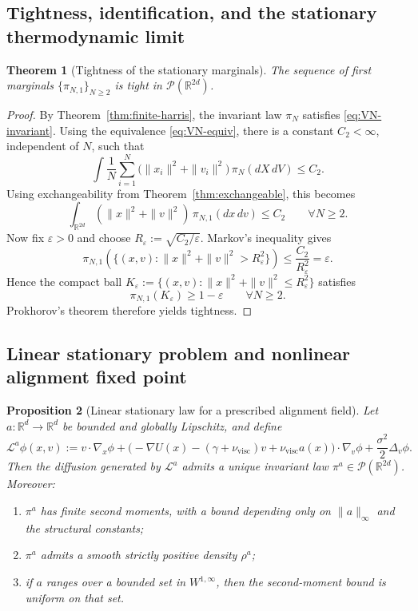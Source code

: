 \documentclass[11pt]{article}
\newtheorem{theorem}{Theorem}[section]
\newtheorem{proposition}[theorem]{Proposition}
\theoremstyle{definition}
\theoremstyle{remark}
\newcommand{\R}{\mathbb{R}}
\newcommand{\mcP}{\mathcal{P}}
\begin{document}
\subsection{Tightness, identification, and the stationary thermodynamic limit}

\begin{theorem}[Tightness of the stationary marginals]\label{thm:tight}
The sequence of first marginals $\{\pi_{N,1}\}_{N\geq2}$ is tight in
$\mcP(\R^{2d})$.
\end{theorem}

\begin{proof}
By Theorem~\ref{thm:finite-harris}, the invariant law \(\pi_N\) satisfies
\eqref{eq:VN-invariant}. Using the equivalence \eqref{eq:VN-equiv}, there is a
constant \(C_2<\infty\), independent of \(N\), such that
\[
\int \frac1N\sum_{i=1}^N \bigl(\|x_i\|^2+\|v_i\|^2\bigr)\,\pi_N(dX\,dV)
\leq C_2.
\]
Using exchangeability from Theorem~\ref{thm:exchangeable}, this becomes
\[
\int_{\R^{2d}} (\|x\|^2+\|v\|^2)\,\pi_{N,1}(dx\,dv)\leq C_2
\qquad
\forall N\geq2.
\]
Now fix $\varepsilon>0$ and choose
$R_\varepsilon:=\sqrt{C_2/\varepsilon}$. Markov's inequality gives
\[
\pi_{N,1}\!\left(\{(x,v):\|x\|^2+\|v\|^2>R_\varepsilon^2\}\right)
\leq
\frac{C_2}{R_\varepsilon^2}
=
\varepsilon.
\]
Hence the compact ball
$K_\varepsilon:=\{(x,v):\|x\|^2+\|v\|^2\leq R_\varepsilon^2\}$ satisfies
\[
\pi_{N,1}(K_\varepsilon)\geq 1-\varepsilon
\qquad
\forall N\geq2.
\]
Prokhorov's theorem therefore yields tightness.
\end{proof}

\subsection{Linear stationary problem and nonlinear alignment fixed point}

\begin{proposition}[Linear stationary law for a prescribed alignment field]\label{prop:linear-mf-stationary}
Let \(a:\R^d\to\R^d\) be bounded and globally Lipschitz, and define
\[
\mathcal L^a\phi(x,v)
:=
v\cdot \nabla_x\phi
+\bigl(-\nabla U(x)-(\gamma+\nu_{\mathrm{visc}})v+\nu_{\mathrm{visc}}a(x)\bigr)
\cdot \nabla_v\phi
+\frac{\sigma^2}{2}\Delta_v\phi.
\]
Then the diffusion generated by \(\mathcal L^a\) admits a unique invariant law
\(\pi^a\in\mcP(\R^{2d})\). Moreover:
\begin{enumerate}[label=\textnormal{(\roman*)},leftmargin=1.5em]
\item \(\pi^a\) has finite second moments, with a bound depending only on
\(\|a\|_\infty\) and the structural constants;
\item \(\pi^a\) admits a smooth strictly positive density \(\rho^a\);
\item if \(a\) ranges over a bounded set in \(W^{1,\infty}\), then the
second-moment bound is uniform on that set.
\end{enumerate}
\end{proposition}
\end{document}
